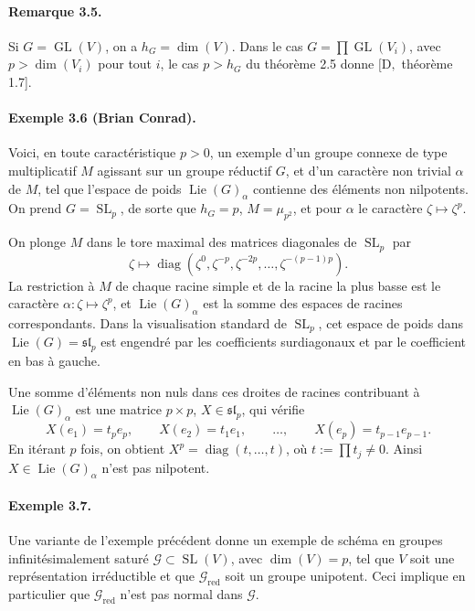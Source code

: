\documentclass[11pt]{article}
\newcommand{\Lie}{\operatorname{Lie}}
\newcommand{\GL}{\operatorname{GL}}
\newcommand{\red}{\mathrm{red}}
\newcommand{\SL}{\operatorname{SL}}
\newcommand{\diag}{\operatorname{diag}}
\begin{document}
\paragraph{Remarque 3.5.}
Si \(G=\GL(V)\), on a \(h_G=\dim(V)\). Dans le cas
\(G=\prod\GL(V_i)\), avec \(p>\dim(V_i)\) pour tout \(i\), le cas \(p>h_G\) du
théorème 2.5 donne \([\mathrm D,\) théorème 1.7].

\paragraph{Exemple 3.6 (Brian Conrad).}
Voici, en toute caractéristique \(p>0\), un exemple d'un groupe connexe de type
multiplicatif \(M\) agissant sur un groupe réductif \(G\), et d'un caractère non trivial
\(\alpha\) de \(M\), tel que l'espace de poids \(\Lie(G)_\alpha\) contienne des éléments
non nilpotents. On prend \(G=\SL_p\), de sorte que \(h_G=p\), \(M=\mu_{p^2}\), et pour
\(\alpha\) le caractère \(\zeta\mapsto\zeta^p\).

On plonge \(M\) dans le tore maximal des matrices diagonales de \(\SL_p\) par
\[
  \zeta\longmapsto\diag(\zeta^0,\zeta^{-p},\zeta^{-2p},\ldots,\zeta^{-(p-1)p}).
\]
La restriction à \(M\) de chaque racine simple et de la racine la plus basse est le
caractère \(\alpha:\zeta\mapsto\zeta^p\), et \(\Lie(G)_\alpha\) est la somme des espaces
de racines correspondants. Dans la visualisation standard de \(\SL_p\), cet espace de
poids dans \(\Lie(G)=\mathfrak{sl}_p\) est engendré par les coefficients
surdiagonaux et par le coefficient en bas à gauche.

Une somme d'éléments non nuls dans ces droites de racines contribuant à
\(\Lie(G)_\alpha\) est une matrice \(p\times p\), \(X\in\mathfrak{sl}_p\), qui vérifie
\begin{equation}
  X(e_1)=t_p e_p,
  \qquad X(e_2)=t_1 e_1,
  \qquad\ldots,
  \qquad X(e_p)=t_{p-1}e_{p-1}.
  \tag{3.6.1}
\end{equation}
En itérant \(p\) fois, on obtient \(X^p=\diag(t,\ldots,t)\), où
\(t:=\prod t_j\ne0\). Ainsi \(X\in\Lie(G)_\alpha\) n'est pas nilpotent.

\paragraph{Exemple 3.7.}
Une variante de l'exemple précédent donne un exemple de schéma en groupes
infinitésimalement saturé \(\mathcal G\subset\SL(V)\), avec \(\dim(V)=p\), tel que
\(V\) soit une représentation irréductible et que \(\mathcal G_{\red}\) soit un groupe
unipotent. Ceci implique en particulier que \(\mathcal G_{\red}\) n'est pas normal dans
\(\mathcal G\).
\end{document}
